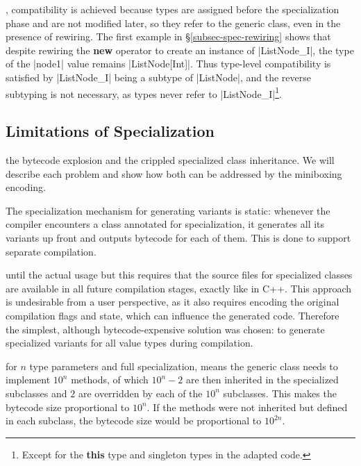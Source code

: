 , compatibility is achieved because types are assigned before the specialization phase and are not modified later, so they refer to the generic class, even in the presence of rewiring. The first example in \S\ref{subsec-spec-rewiring} shows that despite rewiring the {\bf new} operator to create an instance of |ListNode_I|, the type of the |node1| value remains |ListNode[Int]|. Thus type-level compatibility is satisfied by |ListNode_I| being a subtype of |ListNode|, and the reverse subtyping is not necessary, as types never refer to |ListNode_I|\footnote{Except for the {\bf this} type and singleton types in the adapted code.}.

\subsection{Limitations of Specialization}
\label{subsec-spec-limits}

 the bytecode explosion and the crippled specialized class inheritance. We will describe each problem and show how both can be addressed by the miniboxing encoding.

The specialization mechanism for generating variants is static: whenever the compiler encounters a class annotated for specialization, it generates all its variants up front and outputs bytecode for each of them. This is done to support separate compilation.

 until the actual usage but this requires that the source files for specialized classes are available in all future compilation stages, exactly like in C++. This approach is undesirable from a user perspective, as it also requires encoding the original compilation flags and state, which can influence the generated code. Therefore the simplest, although bytecode-expensive solution was chosen: to generate specialized variants for all value types during compilation.

 for $n$ type parameters and full specialization, means the generic class needs to implement $10^n$ methods, of which $10^n - 2$ are then inherited in the specialized subclasses and $2$ are overridden by each of the $10^n$ subclasses. This makes the bytecode size proportional to $10^n$. If the methods were not inherited but defined in each subclass, the bytecode size would be proportional to $10^{2n}$.

